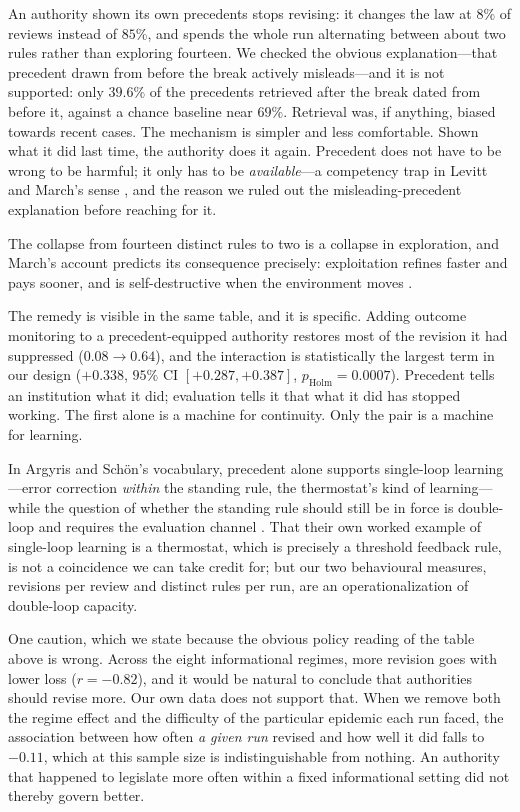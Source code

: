 \documentclass[11pt]{article}
\begin{document}
An authority shown its own precedents stops revising: it changes the law at $8\%$ of reviews instead
of $85\%$, and spends the whole run alternating between about two rules rather than exploring
fourteen. We checked the obvious explanation---that precedent drawn from before the break actively
misleads---and it is not supported: only $39.6\%$ of the precedents retrieved after the break dated
from before it, against a chance baseline near $69\%$. Retrieval was, if anything, biased towards
recent cases. The mechanism is simpler and less comfortable. Shown what it did last time, the
authority does it again. Precedent does not have to be wrong to be harmful; it only has to be
\emph{available}---a competency trap in Levitt and March's sense \citep{levitt1988organizational},
and the reason we ruled out the misleading-precedent explanation before reaching for it.

The collapse from fourteen distinct rules to two is a collapse in exploration, and March's account
predicts its consequence precisely: exploitation refines faster and pays sooner, and is
self-destructive when the environment moves \citep{march1991exploration}.

The remedy is visible in the same table, and it is specific. Adding outcome monitoring to a
precedent-equipped authority restores most of the revision it had suppressed ($0.08 \to 0.64$), and
the interaction is statistically the largest term in our design ($+0.338$, $95\%$ CI
$[+0.287, +0.387]$, $p_{\text{Holm}}=0.0007$). Precedent tells an institution what it did; evaluation
tells it that what it did has stopped working. The first alone is a machine for continuity. Only the
pair is a machine for learning.

In Argyris and Sch\"on's vocabulary, precedent alone supports single-loop learning---error correction
\emph{within} the standing rule, the thermostat's kind of learning---while the question of whether the
standing rule should still be in force is double-loop and requires the evaluation channel
\citep{argyris1978organizational}. That their own worked example of single-loop learning is a
thermostat, which is precisely a threshold feedback rule, is not a coincidence we can take credit
for; but our two behavioural measures, revisions per review and distinct rules per run, are an
operationalization of double-loop capacity.

One caution, which we state because the obvious policy reading of the table above is wrong. Across
the eight informational regimes, more revision goes with lower loss ($r = -0.82$), and it would be
natural to conclude that authorities should revise more. Our own data does not support that. When we
remove both the regime effect and the difficulty of the particular epidemic each run faced, the
association between how often \emph{a given run} revised and how well it did falls to $-0.11$, which
at this sample size is indistinguishable from nothing. An authority that happened to legislate more
often within a fixed informational setting did not thereby govern better.
\end{document}
